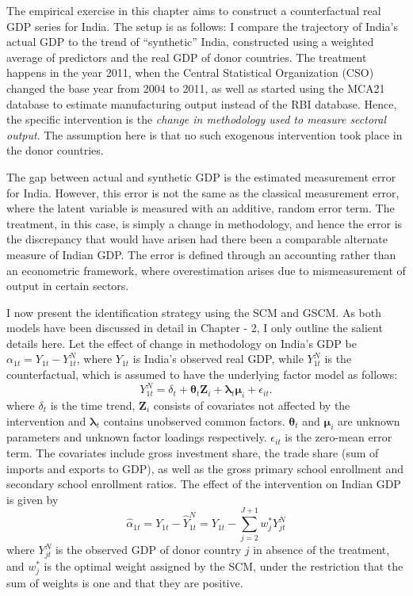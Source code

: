 \documentclass[12pt,nobind, a4paper]{reedthesis}
\begin{document}
 The empirical exercise in this chapter aims to construct a counterfactual real GDP series for India. The setup is as follows: I compare the trajectory of India's actual GDP to the trend of ``synthetic'' India, constructed using a weighted average of predictors and the real GDP of donor countries. The treatment happens in the year 2011, when the Central Statistical Organization (CSO) changed the base year from 2004 to 2011, as well as started using the MCA21 database to estimate manufacturing output instead of the RBI database. Hence, the specific intervention is the \emph{change in methodology used to measure sectoral output}. The assumption here is that no such exogenous intervention took place in the donor countries.
 \linebreak

 The gap between actual and synthetic GDP is the estimated measurement error for India. However, this error is not the same as the classical measurement error, where the latent variable is measured with an additive, random error term. The treatment, in this case, is simply a change in methodology, and hence the error is the discrepancy that would have arisen had there been a comparable alternate measure of Indian GDP. The error is defined through an accounting rather than an econometric framework, where overestimation arises due to mismeasurement of output in certain sectors.
 \linebreak

 I now present the identification strategy using the SCM and GSCM. As both models have been discussed in detail in Chapter - 2, I only outline the salient details here. Let the effect of change in methodology on India's GDP be \(\alpha_{1t}= Y_{1t}-Y^{N}_{1t}\), where \(Y_{1t}\) is India's observed real GDP, while \(Y^{N}_{1t}\) is the counterfactual, which is assumed to have the underlying factor model as follows:
 \begin{equation}
 Y^{N}_{1t}= \delta_{t}+\boldsymbol{\theta}_{t}\mathbf{Z}_{i}+\boldsymbol{\lambda}_{t} \boldsymbol{\mu}_{i}+ \epsilon_{it}.
 \label{eq:eq99}
 \end{equation}
 where \(\delta_{t}\) is the time trend, \(\mathbf{Z}_{i}\) consists of covariates not affected by the intervention and \(\boldsymbol{\lambda}_{t}\) contains unobserved common factors. \(\boldsymbol{\theta}_{t}\) and \(\boldsymbol{\mu}_{i}\) are unknown parameters and unknown factor loadings respectively. \(\epsilon_{it}\) is the zero-mean error term. The covariates include gross investment share, the trade share (sum of imports and exports to GDP), as well as the gross primary school enrollment and secondary school enrollment ratios. The effect of the intervention on Indian GDP is given by
 \begin{equation}
 \hat{\alpha}_{1t}={Y_{1t}}-\hat{Y}^{N}_{1t}={Y_{1t}}-\sum_{j=2}^{J+1}w^{*}_{j}Y^{N}_{jt}
 \label{eq:eq88}
 \end{equation}
 where \(Y^{N}_{jt}\) is the observed GDP of donor country \(j\) in absence of the treatment, and \(w^{*}_{j}\) is the optimal weight assigned by the SCM, under the restriction that the sum of weights is one and that they are positive.
 \linebreak
\end{document}
